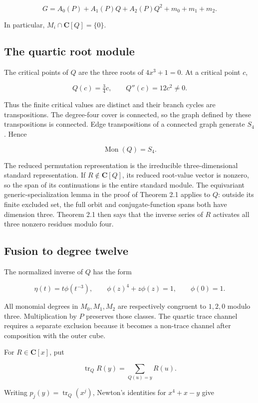 \documentclass[
  11pt,
  a4paper,
]{amsart}
\begin{document}
\[
G=A_0(P)+A_1(P)Q+A_2(P)Q^2+m_0+m_1+m_2.                \tag{4.1}
\]

In particular, \(M_i\cap\mathbf C[Q]=\{0\}\).

\subsection{The quartic root module}

The critical points of \(Q\) are the three roots of \(4x^3+1=0\). At a
critical point \(c\),

\[
Q(c)=\tfrac34c,\qquad Q''(c)=12c^2\ne0.
\]

Thus the finite critical values are distinct and their branch cycles are
transpositions. The degree-four cover is connected, so the graph defined
by these transpositions is connected. Edge transpositions of a connected
graph generate \(S_4\). Hence

\[
\operatorname{Mon}(Q)=S_4.
\]

The reduced permutation representation is the irreducible
three-dimensional standard representation. If \(R\notin\mathbf C[Q]\),
its reduced root-value vector is nonzero, so the span of its
continuations is the entire standard module. The equivariant
generic-specialization lemma in the proof of Theorem 2.1 applies to
\(Q\): outside its finite excluded set, the full orbit and
conjugate-function spans both have dimension three. Theorem 2.1 then
says that the inverse series of \(R\) activates all three nonzero
residues modulo four.

\subsection{Fusion to degree twelve}

The normalized inverse of \(Q\) has the form

\[
\eta(t)=t\phi(t^{-3}),\qquad
\phi(z)^4+z\phi(z)=1,\qquad \phi(0)=1.                  \tag{4.2}
\]

All monomial degrees in \(M_0,M_1,M_2\) are respectively congruent to
\(1,2,0\) modulo three. Multiplication by \(P\) preserves those classes.
The quartic trace channel requires a separate exclusion because it
becomes a non-trace channel after composition with the outer cube.

For \(R\in\mathbf C[x]\), put

\[
\operatorname{tr}_Q R(y)=\sum_{Q(u)=y}R(u).
\]

Writing \(p_j(y)=\operatorname{tr}_Q(x^j)\), Newton's identities for
\(x^4+x-y\) give
\end{document}
